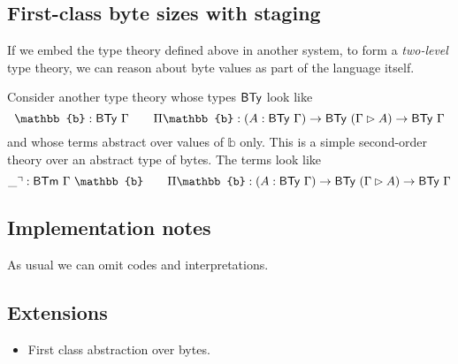 \subsection{First-class byte sizes with
staging}\label{first-class-byte-sizes-with-staging}

If we embed the type theory defined above in another system, to form a
\emph{two-level} type theory, we can reason about byte values as part of
the language itself.

Consider another type theory whose types \(\textsf{BTy}\) look like \[
\mathbb{b} : \syn{BTy}\ \Gamma \qquad
\Pi\mathbb{b} : (A : \syn{BTy}\ \Gamma) \to \syn{BTy}\ (\Gamma \rhd A) \to \syn{BTy}\ \Gamma
\] and whose terms abstract over values of \(\mathbb{b}\) only. This is
a simple second-order theory over an abstract type of bytes. The terms
look like \[
\_\urcorner : \syn{BTm}\ \Gamma\ \mathbb{b} \qquad
\Pi\mathbb{b} : (A : \syn{BTy}\ \Gamma) \to \syn{BTy}\ (\Gamma \rhd A) \to \syn{BTy}\ \Gamma
\]

\subsection{Implementation notes}\label{implementation-notes}

As usual we can omit codes and interpretations.

\subsection{Extensions}\label{extensions}

\begin{itemize}
\tightlist
\item
  First class abstraction over bytes.
\end{itemize}
